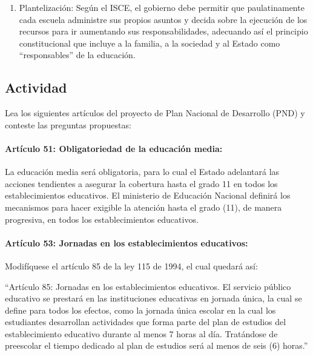 \documentclass[10pt,twoside]{article}
\begin{document}
\begin{enumerate}
\item Plantelización: Según el ISCE, el gobierno debe permitir que paulatinamente cada escuela administre sus propios asuntos y decida sobre la ejecución de los recursos para ir aumentando sus responsabilidades, adecuando así el principio constitucional que incluye a la familia, a la sociedad y al Estado como “responsables” de la educación.
\end{enumerate}
\subsection*{Actividad}
Lea los siguientes artículos del proyecto de Plan Nacional de Desarrollo (PND) y conteste las preguntas propuestas:
\paragraph*{Artículo 51: Obligatoriedad de la educación media:} La educación media será obligatoria, para lo cual el Estado adelantará las acciones tendientes a asegurar la cobertura hasta el grado 11 en todos los establecimientos educativos. El ministerio de Educación Nacional definirá los mecanismos para hacer exigible la atención hasta el grado (11), de manera progresiva, en todos los establecimientos educativos.
\paragraph*{Artículo 53: Jornadas en los establecimientos educativos:} Modifíquese el artículo 85 de la ley 115 de 1994, el cual quedará así:

“Artículo 85: Jornadas en los establecimientos educativos. El servicio público educativo se prestará en las instituciones educativas en jornada única, la cual se define para todos los efectos, como la jornada única escolar en la cual los estudiantes desarrollan actividades que forma parte del plan de estudios del establecimiento educativo durante al menos 7 horas al día. Tratándose de preescolar el tiempo dedicado al plan de estudios será al menos de seis (6) horas.”
\end{document}
